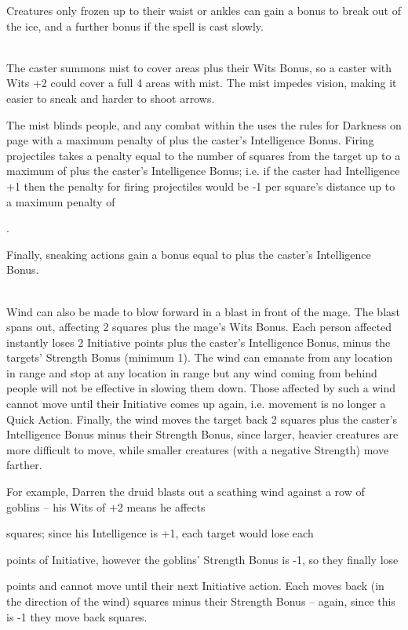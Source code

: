 \begin{multicols}{2}
Creatures only frozen up to their waist or ankles can gain a bonus to break out of the ice, and a further bonus if the spell is cast slowly.

\\
The caster summons mist to cover  areas plus their Wits Bonus, so a caster with Wits +2 could cover a full 4 areas with mist. The mist impedes vision, making it easier to sneak and harder to shoot arrows.

The mist blinds people, and any combat within the uses the rules for Darkness on page \pageref{darkness} with a maximum penalty of  plus the caster's Intelligence Bonus. Firing projectiles takes a penalty equal to the number of squares from the target up to a maximum of  plus the caster's Intelligence Bonus; i.e. if the caster had Intelligence +1 then the penalty for firing projectiles would be -1 per square's distance up to a maximum penalty of \setcounter{list}{0}\addtocounter{list}{-1}\addtocounter{list}{-\value{spelllevel}}.

Finally, sneaking actions gain a bonus equal to  plus the caster's Intelligence Bonus.

\\
Wind can also be made to blow forward in a blast in front of the mage. The blast spans out, affecting 2 squares plus the mage's Wits Bonus. Each person affected instantly loses 2 Initiative points plus the caster's Intelligence Bonus, minus the targets' Strength Bonus (minimum 1). The wind can emanate from any location in range and stop at any location in range but any wind coming from behind people will not be effective in slowing them down. Those affected by such a wind cannot move until their Initiative comes up again, i.e. movement is no longer a Quick Action. Finally, the wind moves the target back 2 squares plus the caster's Intelligence Bonus minus their Strength Bonus, since larger, heavier creatures are more difficult to move, while smaller creatures (with a negative Strength) move farther.

For example, Darren the druid blasts out a scathing wind against a row of goblins -- his Wits of +2 means he affects \setcounter{list}{2}\addtocounter{list}{\value{spelllevel}} squares; since his Intelligence is +1, each target would lose each \setcounter{enc}{1}\addtocounter{enc}{\value{spelllevel}} points of Initiative, however the goblins' Strength Bonus is -1, so they finally lose \addtocounter{enc}{1} points and cannot move until their next Initiative action.
Each moves back (in the direction of the wind)  squares minus their Strength Bonus -- again, since this is -1 they move back  squares.


\end{multicols}
